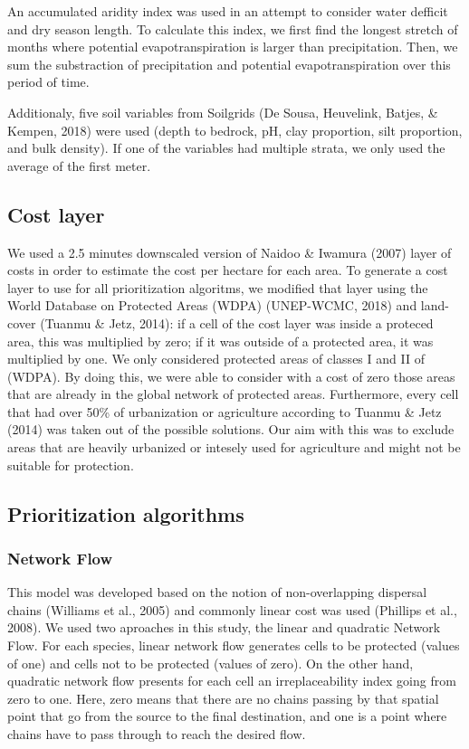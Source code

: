 \documentclass[]{article}
\begin{document}
An accumulated aridity index was used in an attempt to consider water defficit and dry season length. To calculate this index, we first find the longest stretch of months where potential evapotranspiration is larger than precipitation. Then, we sum the substraction of precipitation and potential evapotranspiration over this period of time.

Additionaly, five soil variables from Soilgrids (De Sousa, Heuvelink, Batjes, \& Kempen, 2018) were used (depth to bedrock, pH, clay proportion, silt proportion, and bulk density). If one of the variables had multiple strata, we only used the average of the first meter.

\hypertarget{cost-layer}{%
\subsection{Cost layer}\label{cost-layer}}

We used a 2.5 minutes downscaled version of Naidoo \& Iwamura (2007) layer of costs in order to estimate the cost per hectare for each area. To generate a cost layer to use for all prioritization algoritms, we modified that layer using the World Database on Protected Areas (WDPA) (UNEP-WCMC, 2018) and land-cover (Tuanmu \& Jetz, 2014): if a cell of the cost layer was inside a proteced area, this was multiplied by zero; if it was outside of a protected area, it was multiplied by one. We only considered protected areas of classes I and II of (WDPA). By doing this, we were able to consider with a cost of zero those areas that are already in the global network of protected areas. Furthermore, every cell that had over 50\% of urbanization or agriculture according to Tuanmu \& Jetz (2014) was taken out of the possible solutions. Our aim with this was to exclude areas that are heavily urbanized or intesely used for agriculture and might not be suitable for protection.

\hypertarget{prioritization-algorithms}{%
\subsection{Prioritization algorithms}\label{prioritization-algorithms}}

\hypertarget{network-flow}{%
\subsubsection{Network Flow}\label{network-flow}}

This model was developed based on the notion of non-overlapping dispersal chains (Williams et al., 2005) and commonly linear cost was used (Phillips et al., 2008). We used two aproaches in this study, the linear and quadratic Network Flow. For each species, linear network flow generates cells to be protected (values of one) and cells not to be protected (values of zero). On the other hand, quadratic network flow presents for each cell an irreplaceability index going from zero to one. Here, zero means that there are no chains passing by that spatial point that go from the source to the final destination, and one is a point where chains have to pass through to reach the desired flow.
\end{document}
